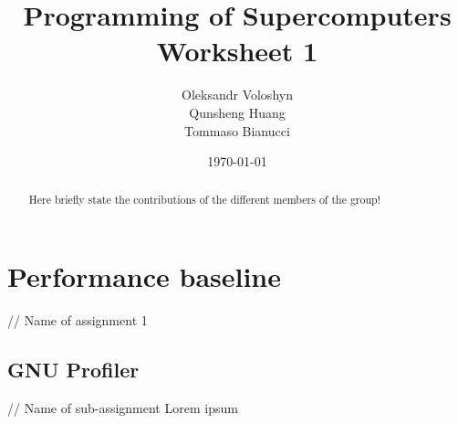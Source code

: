 \documentclass{article}
\title{Programming of Supercomputers\\Worksheet 1}
\author{Oleksandr Voloshyn\\ Qunsheng Huang\\ Tommaso Bianucci}
\date{\today}
\begin{document}
\maketitle
\renewcommand{\abstractname}{Group members's contributions}
\begin{abstract}
	Here briefly state the contributions of the different members of the group!
\end{abstract}

\section{Performance baseline} // Name of assignment 1
\subsection{GNU Profiler} // Name of sub-assignment
Lorem ipsum
\end{document}
